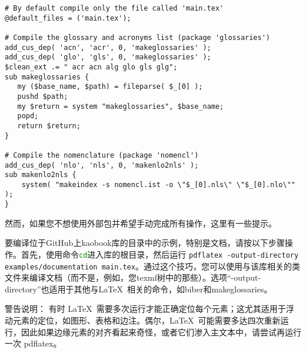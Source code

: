 \begin{lstlisting}
# By default compile only the file called 'main.tex'
@default_files = ('main.tex');

# Compile the glossary and acronyms list (package 'glossaries')
add_cus_dep( 'acn', 'acr', 0, 'makeglossaries' );
add_cus_dep( 'glo', 'gls', 0, 'makeglossaries' );
$clean_ext .= " acr acn alg glo gls glg";
sub makeglossaries {
   my ($base_name, $path) = fileparse( $_[0] );
   pushd $path;
   my $return = system "makeglossaries", $base_name;
   popd;
   return $return;
}

# Compile the nomenclature (package 'nomencl')
add_cus_dep( 'nlo', 'nls', 0, 'makenlo2nls' );
sub makenlo2nls {
    system( "makeindex -s nomencl.ist -o \"$_[0].nls\" \"$_[0].nlo\"" );
}
\end{lstlisting}

然而，如果您不想使用外部包并希望手动完成所有操作，这里有一些提示。

要编译位于GitHub上kaobook库的目录中的示例，特别是文档，请按以下步骤操作。首先，使用命令\lstinline[language=bash]|cd|进入库的根目录，然后运行
\lstinline|pdflatex -output-directory examples/documentation main.tex|。通过这个技巧，您可以使用与该库相关的类文件来编译文档（而不是，例如，您texmf树中的那些）。选项\enquote{-output-directory}也适用于其他与\LaTeX\ 相关的命令，如biber和makeglossaries。

警告说明： 有时 \LaTeX\ 需要多次运行才能正确定位每个元素；这尤其适用于浮动元素的定位，如图形、表格和边注。偶尔，\LaTeX\ 可能需要多达四次重新运行，因此如果边缘元素的对齐看起来奇怪，或者它们渗入主文本中，请尝试再运行一次 pdflatex。 